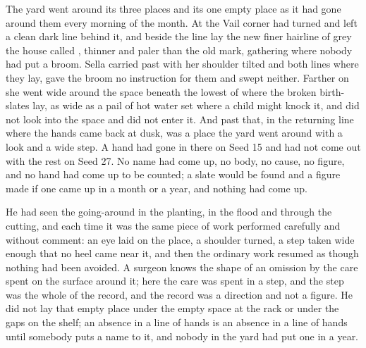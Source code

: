 The yard went around its three places and its one empty place as it had gone around them every morning of the month. At the Vail corner  had turned and left a clean dark line behind it, and beside the line lay the new finer hairline of grey the house called , thinner and paler than the old mark, gathering where nobody had put a broom. Sella carried past with her shoulder tilted and both lines where they lay, gave the broom no instruction for them and swept neither. Farther on she went wide around the space beneath the lowest of  where the broken birth-slates lay, as wide as a pail of hot water set where a child might knock it, and did not look into the space and did not enter it. And past that, in the returning line where the hands came back at dusk, was a place the yard went around with a look and a wide step. A hand had gone in there on Seed 15 and had not come out with the rest on Seed 27. No name had come up, no body, no cause, no figure, and no hand had come up to be counted; a slate would be found and a figure made if one came up in a month or a year, and nothing had come up.

He had seen the going-around in the planting, in the flood and through the cutting, and each time it was the same piece of work performed carefully and without comment: an eye laid on the place, a shoulder turned, a step taken wide enough that no heel came near it, and then the ordinary work resumed as though nothing had been avoided. A surgeon knows the shape of an omission by the care spent on the surface around it; here the care was spent in a step, and the step was the whole of the record, and the record was a direction and not a figure. He did not lay that empty place under the empty space at the rack or under the gaps on the shelf; an absence in a line of hands is an absence in a line of hands until somebody puts a name to it, and nobody in the yard had put one in a year.

\scenebreak

